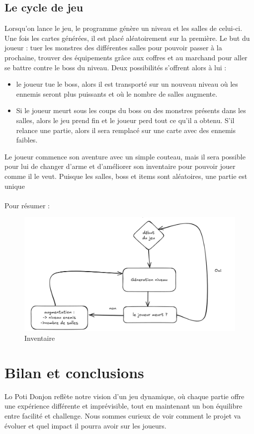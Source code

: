 \documentclass[a4paper,11pt]{article}
\begin{document}
\subsection{Le cycle de jeu}

Lorsqu'on lance le jeu, le programme génère un niveau et les salles de celui-ci. 
Une fois les cartes générées, il est placé aléatoirement sur la première. Le but du joueur : tuer les monstres des différentes salles pour pouvoir passer à la prochaine, 
trouver des équipements grâce aux coffres et au marchand pour aller se battre contre le boss du niveau. Deux possibilités s'offrent alors à lui :
\begin{itemize}
    \item le joueur tue le boss, alors il est transporté sur un nouveau niveau où les ennemis seront plus puissants et où le nombre de salles augmente.
    \item Si le joueur meurt sous les coups du boss ou des monstres présents dans les salles, alors le jeu prend fin et le joueur perd tout ce qu'il a obtenu. S'il relance une partie, alors il sera remplacé sur une carte avec des ennemis faibles.
\end{itemize}
Le joueur commence son aventure avec un simple couteau, mais il sera possible pour lui de changer d'arme et d'améliorer son inventaire pour pouvoir jouer comme il le veut. Puisque les salles, boss et items sont aléatoires, une partie est unique
\\\\
Pour résumer : 
\begin{figure}[h] 
    \centering 
    \includegraphics[width=0.4\linewidth]{./img/scchemaCycleJeu.png} 
    \caption{Inventaire} 
\end{figure} 

\section{Bilan et conclusions}

Lo Poti Donjon reflète notre vision d'un jeu dynamique, où chaque partie offre une expérience différente et imprévisible, tout en maintenant un bon équilibre entre facilité et challenge. Nous sommes curieux de voir comment le projet va évoluer et quel impact il pourra avoir sur les joueurs.
\end{document}
